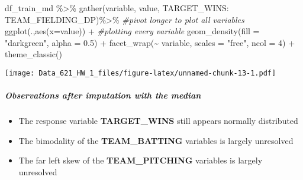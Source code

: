 \documentclass[
]{article}
\newenvironment{Shaded}{\begin{snugshade}}{\end{snugshade}}
\newcommand{\AttributeTok}[1]{\textcolor[rgb]{0.77,0.63,0.00}{#1}}
\newcommand{\CommentTok}[1]{\textcolor[rgb]{0.56,0.35,0.01}{\textit{#1}}}
\newcommand{\DecValTok}[1]{\textcolor[rgb]{0.00,0.00,0.81}{#1}}
\newcommand{\FloatTok}[1]{\textcolor[rgb]{0.00,0.00,0.81}{#1}}
\newcommand{\FunctionTok}[1]{\textcolor[rgb]{0.00,0.00,0.00}{#1}}
\newcommand{\NormalTok}[1]{#1}
\newcommand{\SpecialCharTok}[1]{\textcolor[rgb]{0.00,0.00,0.00}{#1}}
\newcommand{\StringTok}[1]{\textcolor[rgb]{0.31,0.60,0.02}{#1}}
\providecommand{\tightlist}{%
  \setlength{\itemsep}{0pt}\setlength{\parskip}{0pt}}
\begin{document}
\begin{Shaded}
\begin{Highlighting}[]
\NormalTok{df\_train\_md }\SpecialCharTok{\%\textgreater{}\%} 
  \FunctionTok{gather}\NormalTok{(variable, value, TARGET\_WINS}\SpecialCharTok{:}\NormalTok{ TEAM\_FIELDING\_DP)}\SpecialCharTok{\%\textgreater{}\%} \CommentTok{\#pivot longer to plot all variables}
  \FunctionTok{ggplot}\NormalTok{(.,}\FunctionTok{aes}\NormalTok{(}\AttributeTok{x=}\NormalTok{value)) }\SpecialCharTok{+} \CommentTok{\#plotting every variable}
  \FunctionTok{geom\_density}\NormalTok{(}\AttributeTok{fill =} \StringTok{"darkgreen"}\NormalTok{, }\AttributeTok{alpha =} \FloatTok{0.5}\NormalTok{) }\SpecialCharTok{+}
  \FunctionTok{facet\_wrap}\NormalTok{(}\SpecialCharTok{\textasciitilde{}}\NormalTok{ variable, }\AttributeTok{scales =} \StringTok{"free"}\NormalTok{, }\AttributeTok{ncol =} \DecValTok{4}\NormalTok{) }\SpecialCharTok{+}
  \FunctionTok{theme\_classic}\NormalTok{()}
\end{Highlighting}
\end{Shaded}

\texttt{[image: Data\_621\_HW\_1\_files/figure-latex/unnamed-chunk-13-1.pdf]}

\hypertarget{observations-after-imputation-with-the-median}{%
\subparagraph{Observations after imputation with the
median}\label{observations-after-imputation-with-the-median}}

\begin{itemize}
\tightlist
\item
  The response variable \textbf{TARGET\_WINS} still appears normally
  distributed
\item
  The bimodality of the \textbf{TEAM\_BATTING} variables is largely
  unresolved
\item
  The far left skew of the \textbf{TEAM\_PITCHING} variables is largely
  unresolved
\end{itemize}
\end{document}
